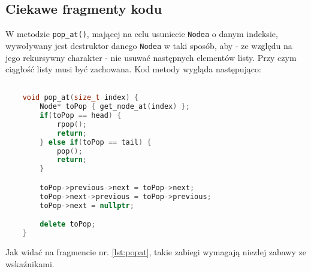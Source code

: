 \subsection{Ciekawe fragmenty kodu}

W metodzie \texttt{pop\_at()}, mającej na celu usuniecie \texttt{Nodea} o danym indeksie, wywoływany jest destruktor danego \texttt{Nodea} w taki sposób, aby - ze względu na jego rekursywny charakter - nie usuwać następnych elementów listy. Przy czym ciągłość listy musi być zachowana. Kod metody wygląda następująco:

\begin{lstlisting}[caption=Kod \texttt{pop\_at()}, label={lst:popat}, language=C++]

	void pop_at(size_t index) {
		Node* toPop { get_node_at(index) };
		if(toPop == head) {
			rpop();
			return;
		} else if(toPop == tail) {
			pop();
			return;
		}

		toPop->previous->next = toPop->next;
		toPop->next->previous = toPop->previous;
		toPop->next = nullptr;

		delete toPop;
	}

\end{lstlisting}

Jak widać na fragmencie nr. \ref{lst:popat}, takie zabiegi wymagają niezłej zabawy ze wskaźnikami. 
